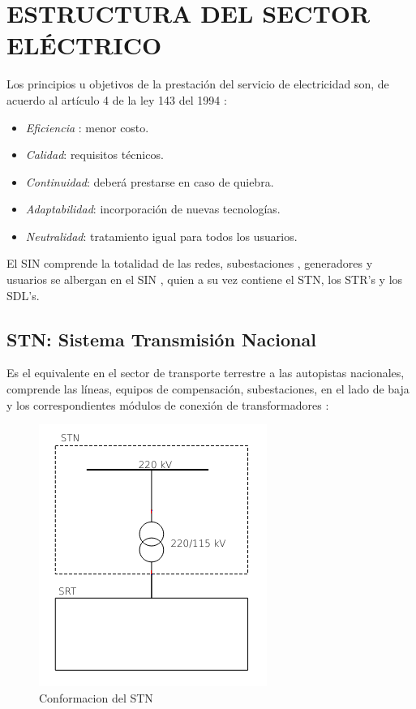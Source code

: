 \documentclass[a5paper]{book}%
\begin{document}
\chapter{ESTRUCTURA DEL SECTOR ELÉCTRICO}

Los principios u objetivos de la prestación del servicio de electricidad son, de acuerdo al artículo 4 de  la ley  143 del 1994 \cite{LEY143}:

\begin{itemize}
\item\textit{ Eficiencia }: menor costo.
\item \textit{Calidad}: requisitos técnicos.
\item \textit{Continuidad}: deberá prestarse en caso de quiebra.
\item \textit{Adaptabilidad}: incorporación de nuevas tecnologías.
\item \textit{Neutralidad}: tratamiento igual para todos los usuarios.
\end{itemize}

El \ac{SIN} comprende la totalidad de las redes, subestaciones , generadores y usuarios se albergan en el \ac{SIN} , quien a su vez contiene el \ac{STN}, los  \ac{STR}'s y  los \ac{SDL}'s.

\section{STN: Sistema Transmisión Nacional}
Es el equivalente en el sector de transporte terrestre  a las autopistas nacionales, comprende las líneas, equipos de compensación, subestaciones, en el lado de baja y los correspondientes módulos de conexión de transformadores \cite{XM-2018-1}:
\begin{center}
\end{center}

\begin{figure}[H]
  \centering
  \caption{Conformacion del STN}
  \includegraphics[width=0.5\linewidth]{STN_F}
\end{figure}
\end{document}
